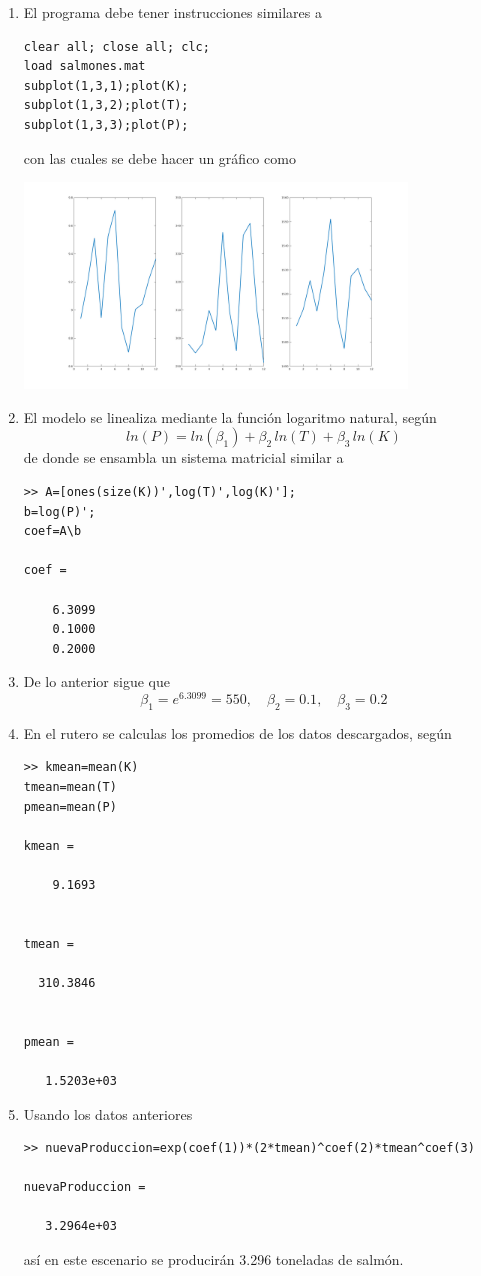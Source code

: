 \begin{enumerate}
\item[a-b)] El programa debe tener instrucciones similares a
\begin{lstlisting}
clear all; close all; clc;
load salmones.mat
subplot(1,3,1);plot(K);
subplot(1,3,2);plot(T);
subplot(1,3,3);plot(P);
\end{lstlisting}
con las cuales se debe hacer un gr\'afico como
\begin{center}
\includegraphics[width=0.8\textwidth]{./cobb-douglas.png}
\end{center}

\item[c)] El modelo se linealiza mediante la funci\'on logaritmo natural, seg\'un
$$
ln(P)=ln(\beta_1)+\beta_2\,ln(T)+\beta_3\,ln(K)
$$
de donde se ensambla un sistema matricial similar a
\begin{lstlisting}
>> A=[ones(size(K))',log(T)',log(K)'];
b=log(P)';
coef=A\b

coef =

    6.3099
    0.1000
    0.2000
\end{lstlisting}
\item[d)] De lo anterior sigue que
$$
\beta_1=e^{{6.3099}}=550, \quad \beta_2=0.1,\quad \beta_3=0.2
$$

\item[e)] En el rutero se calculas los promedios de los datos descargados, seg\'un
\begin{lstlisting}
>> kmean=mean(K)
tmean=mean(T)
pmean=mean(P)

kmean =

    9.1693


tmean =

  310.3846


pmean =

   1.5203e+03
\end{lstlisting}
\item Usando los datos anteriores
\begin{lstlisting}
>> nuevaProduccion=exp(coef(1))*(2*tmean)^coef(2)*tmean^coef(3)

nuevaProduccion =

   3.2964e+03
\end{lstlisting}
as\'i en este escenario se producir\'an 3.296 toneladas de salm\'on.
\end{enumerate}



